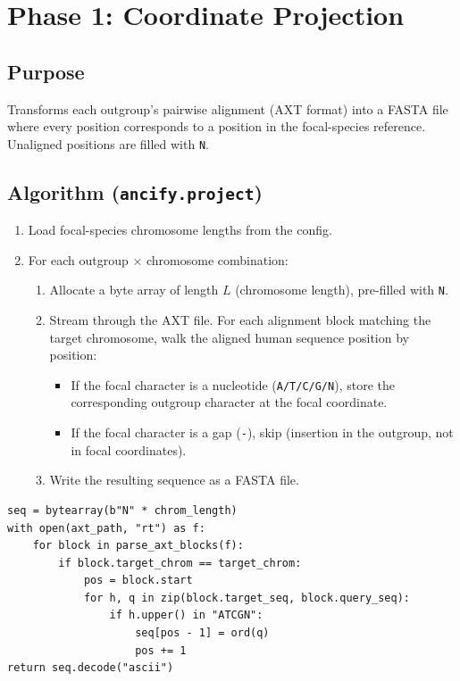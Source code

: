 \documentclass[11pt,a4paper]{article}
\begin{document}
\section{Phase 1: Coordinate Projection}
\label{sec:phase1}

\subsection{Purpose}

Transforms each outgroup's pairwise alignment (AXT format) into a FASTA file where every position corresponds to a position in the focal-species reference.  Unaligned positions are filled with \texttt{N}.

\subsection{Algorithm (\texttt{ancify.project})}

\begin{enumerate}[leftmargin=2em]
    \item Load focal-species chromosome lengths from the config.
    \item For each outgroup $\times$ chromosome combination:
    \begin{enumerate}
        \item Allocate a byte array of length $L$ (chromosome length), pre-filled with \texttt{N}.
        \item Stream through the AXT file.  For each alignment block matching the target chromosome, walk the aligned human sequence position by position:
        \begin{itemize}
            \item If the focal character is a nucleotide (\texttt{A/T/C/G/N}), store the corresponding outgroup character at the focal coordinate.
            \item If the focal character is a gap (\texttt{-}), skip (insertion in the outgroup, not in focal coordinates).
        \end{itemize}
        \item Write the resulting sequence as a FASTA file.
    \end{enumerate}
\end{enumerate}

\begin{lstlisting}[caption={Core projection logic (simplified from \texttt{project.py}).}]
seq = bytearray(b"N" * chrom_length)
with open(axt_path, "rt") as f:
    for block in parse_axt_blocks(f):
        if block.target_chrom == target_chrom:
            pos = block.start
            for h, q in zip(block.target_seq, block.query_seq):
                if h.upper() in "ATCGN":
                    seq[pos - 1] = ord(q)
                    pos += 1
return seq.decode("ascii")
\end{lstlisting}
\end{document}
